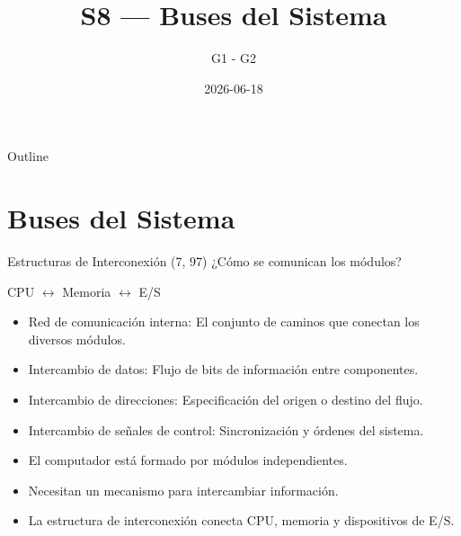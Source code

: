 \documentclass[presentation]{beamer}
\author{G1 - G2}
\date{2026-06-18}
\title{S8 — Buses del Sistema}
\begin{document}
\maketitle
\begin{frame}{Outline}
\tableofcontents
\end{frame}


\section{Buses del Sistema}
\label{sec:org3ca6eba}
\begin{frame}[allowframebreaks]{Estructuras de Interconexión (7, 97)}
¿Cómo se comunican los módulos?
\begin{center}
\alert{CPU} \(\leftrightarrow\) \alert{Memoria} \(\leftrightarrow\) \alert{E/S}
\end{center}

\begin{itemize}
\item \alert{Red de comunicación interna:} El conjunto de caminos que conectan los diversos módulos.
\item \alert{Intercambio de datos:} Flujo de bits de información entre componentes.
\item \alert{Intercambio de direcciones:} Especificación del origen o destino del flujo.
\item \alert{Intercambio de señales de control:} Sincronización y órdenes del sistema.

\item El computador está formado por módulos independientes.
\item Necesitan un mecanismo para intercambiar información.
\item La estructura de interconexión conecta CPU, memoria y dispositivos de E/S.
\end{itemize}
\end{frame}
\end{document}
